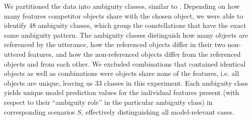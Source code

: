 \documentclass[10pt,a4paper]{article}
\begin{document}
We partitioned the data into ambiguity classes, similar to . Depending on how many features competitor objects share with the chosen object, we were able to identify 48 ambiguity classes, which group the constellations that have the exact same ambiguity pattern. The ambiguity classes distinguish how many objects are referenced by the utterance, how the referenced objects differ in their two non-uttered features, and how the non-referenced objects differ from the referenced objects and from each other. We excluded combinations that contained identical objects as well as combinations were objects share none of the features, i.e. all objects are unique, leaving us 33 classes in this experiment. Each ambiguity class yields unique model prediction values for the individual features present (with respect to their ``ambiguity role'' in the particular ambiguity class) in corresponding scenarios $S$, effectively distinguishing all model-relevant cases.

\end{document}
